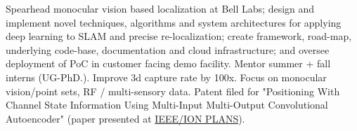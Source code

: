 \documentclass[]{deedy-resume-openfont}
\begin{document}
\begin{minipage}[t]{0.58\textwidth} 



\vspace{-0.1cm} %
 \newline





Spearhead monocular vision based localization at Bell Labs; design and implement novel techniques, algorithms and  system architectures for applying deep learning to SLAM and precise re-localization; create framework, road-map, underlying code-base, documentation and cloud infrastructure; and oversee deployment of PoC in customer facing demo facility. Mentor summer + fall interns (UG-PhD.). Improve 3d capture rate by 100x. Focus on monocular vision/point sets,  RF / multi-sensory data. Patent filed for "Positioning With Channel State Information Using Multi-Input Multi-Output Convolutional Autoencoder" (paper presented at \href{https://www.ion.org/plans/abstracts.cfm?paperID=8295}{IEEE/ION PLANS}).


\sectionseplg





\end{minipage}
\end{document}
